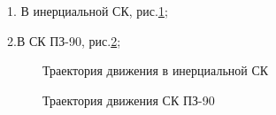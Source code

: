\documentclass[]{article}
\begin{document}
1. В инерциальной СК, рис.\ref{inertz};

2.В СК ПЗ-90, рис.\ref{PZ};




\begin{figure}[h!]
	
	\caption{Траектория движения в инерциальной СК  }
	\label{inertz}
\end{figure}

\begin{figure}[h!]
	
	\caption{Траектория движения  СК ПЗ-90 }
	\label{PZ}
\end{figure}
\end{document}
